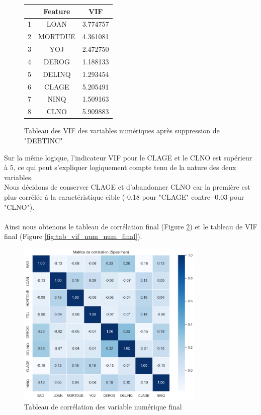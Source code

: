 \documentclass[a4paper,12pt]{report}
\begin{document}
\begin{figure}[h!]
  \begin{center}
    \begin{tabular}{||c c c||} 
     \hline
      & Feature & VIF \\ [0.5ex] 
     \hline\hline
     1 & LOAN & 3.774757 \\ 
     \hline
     2 & MORTDUE & 4.361081 \\
     \hline
     3 & YOJ & 2.472750 \\
     \hline
     4 & DEROG & 1.188133 \\
     \hline
     5 & DELINQ & 1.293454 \\
     \hline
     6 & CLAGE & 5.205491 \\
     \hline
     7 & NINQ & 1.509163 \\
     \hline
     8 & CLNO & 5.909883 \\ [1ex] 
     \hline
    \end{tabular}
  \end{center}
  \caption{Tableau des VIF des variables numériques après suppression de "DEBTINC"}
  \label{fig:tab_vif_num_num_intermediary}
\end{figure}

Sur la même logique, l'indicateur VIF pour le CLAGE et le CLNO est supérieur à 5, ce qui peut s'expliquer logiquement compte tenu de la nature des deux variables.\\
Nous décidons de conserver CLAGE et d'abandonner CLNO car la première est plus corrélée à la caractéristique cible (-0.18 pour "CLAGE" contre -0.03 pour "CLNO").\\
\\
Ainsi nous obtenons le tableau de corrélation final (Figure \ref{fig:tab_corr_num_num_final}) et le tableau de VIF final (Figure \ref{fig:tab_vif_num_num_final}).

\begin{figure}[h!]
  \begin{center}
    \includegraphics[width=0.8\textwidth]{../images/tab_corr_num_num_final.png}
  \end{center}
  \caption{Tableau de corrélation des variable numérique final}
  \label{fig:tab_corr_num_num_final}
\end{figure}
\end{document}
